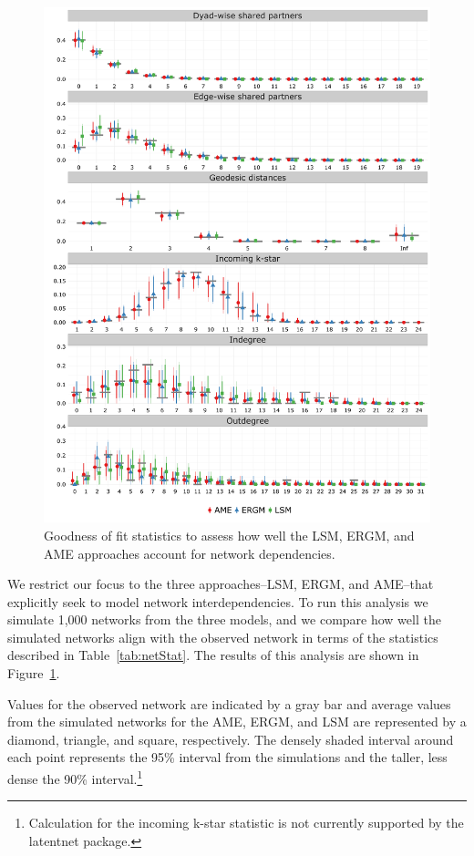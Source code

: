 \documentclass[12pt,onesided,pdflatex]{amsart}
\newcommand{\pkg}[1]{{\fontseries{b}\selectfont #1}}
\begin{document}
\begin{figure}[ht]
	\centering
	\includegraphics[width=1\textwidth]{ggGofAll}
	\caption{Goodness of fit statistics to assess how well the LSM, ERGM, and AME approaches account for network dependencies.}
	\label{fig:gofAll}
\end{figure}
\FloatBarrier

We restrict our focus to the three approaches--LSM, ERGM, and AME--that explicitly seek to model network interdependencies. To run this analysis we simulate 1,000 networks from the three models, and we compare how well the simulated networks align with the observed network in terms of the statistics described in Table~\ref{tab:netStat}. The results of this analysis are shown in Figure~\ref{fig:gofAll}. 

Values for the observed network are indicated by a gray bar and average values from the simulated networks for the AME, ERGM, and LSM are represented by a diamond, triangle, and square, respectively. The densely shaded interval around each point represents the 95\% interval from the simulations and the taller, less dense the 90\% interval.\footnote{Calculation for the incoming k-star statistic is not currently supported by the \pkg{latentnet} package.} 
\end{document}
